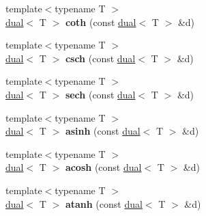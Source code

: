 \begin{DoxyCompactItemize}
\item 
\hypertarget{namespace_d_r_d_s_p_a8e82d06e9a4b307ef3dc03fcf3ec908a}{{\footnotesize template$<$typename T $>$ }\\\hyperlink{struct_d_r_d_s_p_1_1dual}{dual}$<$ T $>$ {\bfseries coth} (const \hyperlink{struct_d_r_d_s_p_1_1dual}{dual}$<$ T $>$ \&d)}\label{namespace_d_r_d_s_p_a8e82d06e9a4b307ef3dc03fcf3ec908a}

\item 
\hypertarget{namespace_d_r_d_s_p_a5af6296c47f4aabc1f85b64e65f91033}{{\footnotesize template$<$typename T $>$ }\\\hyperlink{struct_d_r_d_s_p_1_1dual}{dual}$<$ T $>$ {\bfseries csch} (const \hyperlink{struct_d_r_d_s_p_1_1dual}{dual}$<$ T $>$ \&d)}\label{namespace_d_r_d_s_p_a5af6296c47f4aabc1f85b64e65f91033}

\item 
\hypertarget{namespace_d_r_d_s_p_aad69e073ac4776c14081ea6542927b5f}{{\footnotesize template$<$typename T $>$ }\\\hyperlink{struct_d_r_d_s_p_1_1dual}{dual}$<$ T $>$ {\bfseries sech} (const \hyperlink{struct_d_r_d_s_p_1_1dual}{dual}$<$ T $>$ \&d)}\label{namespace_d_r_d_s_p_aad69e073ac4776c14081ea6542927b5f}

\item 
\hypertarget{namespace_d_r_d_s_p_a6618f3fdf2d784119744176043dfc2eb}{{\footnotesize template$<$typename T $>$ }\\\hyperlink{struct_d_r_d_s_p_1_1dual}{dual}$<$ T $>$ {\bfseries asinh} (const \hyperlink{struct_d_r_d_s_p_1_1dual}{dual}$<$ T $>$ \&d)}\label{namespace_d_r_d_s_p_a6618f3fdf2d784119744176043dfc2eb}

\item 
\hypertarget{namespace_d_r_d_s_p_ad36ff16d3877d7ec11a97f1acd909390}{{\footnotesize template$<$typename T $>$ }\\\hyperlink{struct_d_r_d_s_p_1_1dual}{dual}$<$ T $>$ {\bfseries acosh} (const \hyperlink{struct_d_r_d_s_p_1_1dual}{dual}$<$ T $>$ \&d)}\label{namespace_d_r_d_s_p_ad36ff16d3877d7ec11a97f1acd909390}

\item 
\hypertarget{namespace_d_r_d_s_p_ae3e3962e2b5ba30e10dd274a79bd9a4b}{{\footnotesize template$<$typename T $>$ }\\\hyperlink{struct_d_r_d_s_p_1_1dual}{dual}$<$ T $>$ {\bfseries atanh} (const \hyperlink{struct_d_r_d_s_p_1_1dual}{dual}$<$ T $>$ \&d)}\label{namespace_d_r_d_s_p_ae3e3962e2b5ba30e10dd274a79bd9a4b}


\end{DoxyCompactItemize}

